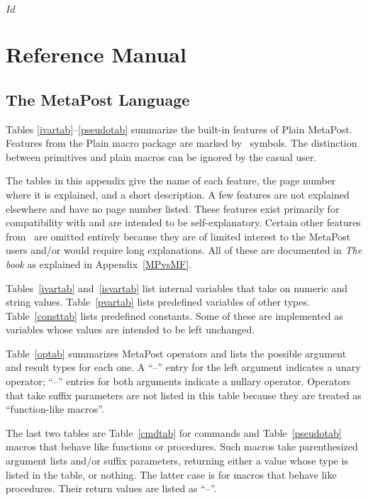 \svnInfo $Id$
\section{Reference Manual}
\label{refman}

\begingroup
\renewcommand\topfraction{1.0}%
\renewcommand\textfraction{0.0}
\setcounter{topnumber}{10}
\setcounter{totalnumber}{10}

\subsection{The MetaPost Language}
\label{refman:lang}

Tables \ref{ivartab}--\ref{pseudotab} summarize the built-in features of
Plain MetaPost.  Features from the Plain macro
package are marked by \pl\ symbols.  The distinction between primitives
and plain macros can be ignored by the casual user.

The tables in this appendix give the name of each feature, the page
number where it is explained, and a short description.  A few features
are not explained elsewhere and have no page number listed.  These
features exist primarily for compatibility with \MF{}
and are intended to be self-explanatory.  Certain other features from
\MF\ are omitted entirely because they are of limited interest to the
MetaPost users and/or would require long explanations.  All of these are
documented in {\sl The \MF book} \cite{kn:c} as explained in
Appendix~\ref{MPvsMF}.

Tables~\ref{ivartab} and~\ref{isvartab} list internal variables that
take on numeric and string values.  Table~\ref{pvartab} lists predefined
variables of other types.  Table~\ref{consttab} lists predefined
constants.  Some of these are implemented as variables whose values are
intended to be left unchanged.

Table~\ref{optab} summarizes MetaPost operators and lists
the possible argument and result types for each one.  A ``--'' entry for
the left argument indicates a unary operator; ``--'' entries for both
arguments indicate a nullary operator.  Operators that take suffix
parameters are not listed in this table because they are treated as
``function-like macros''.

The last two tables are Table~\ref{cmdtab} for commands and
Table~\ref{pseudotab} macros that behave like functions or procedures.
Such macros take parenthesized argument lists and/or suffix parameters,
returning either a value whose type is listed in the table, or nothing.
The latter case is for macros that behave like procedures.  Their return
values are listed as ``--''.

